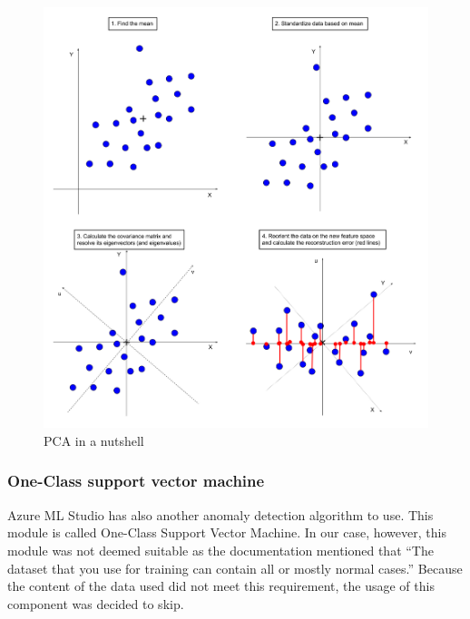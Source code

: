 \begin{figure}[htb]
    \centering
    \includegraphics[width=150mm]{./appendices/pca-nutshell}
    \caption{PCA in a nutshell
        \label{fig:pca-nutshell}}
\end{figure}


\subsubsection*{One-Class support vector machine}

Azure ML Studio has also another anomaly detection algorithm to use.
This module is called One-Class Support Vector Machine.
In our case, however,
this module was not deemed suitable
as the documentation mentioned that
\enquote{The dataset that you use for training
can contain all or mostly normal cases.}
Because the content of the data used did not meet this requirement,
the usage of this component was decided to skip.

